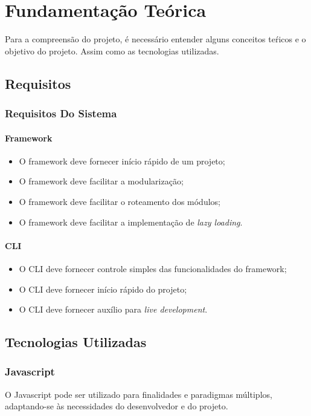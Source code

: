 \chapter{Fundamentação Teórica}
\label{ch:fundamentacao}
\par Para a compreensão do projeto, é necessário entender alguns conceitos teŕicos e o objetivo do projeto. Assim como as tecnologias utilizadas.

\section{Requisitos}
\subsection{Requisitos Do Sistema}
\subsubsection{Framework}
\begin{itemize}
    \item O framework deve fornecer início rápido de um projeto;
    \item O framework deve facilitar a modularização;
    \item O framework deve facilitar o roteamento dos módulos;
    \item O framework deve facilitar a implementação de \textit{lazy loading}.
\end{itemize}

\subsubsection{CLI}
\begin{itemize}
    \item O CLI deve fornecer controle simples das funcionalidades do framework;
    \item O CLI deve fornecer início rápido do projeto;
    \item O CLI deve fornecer auxílio para \textit{live development}.
\end{itemize}

\section{Tecnologias Utilizadas}

\subsection{Javascript}
\par O Javascript pode ser utilizado para finalidades e paradigmas múltiplos, adaptando-se às necessidades do desenvolvedor e do projeto.

